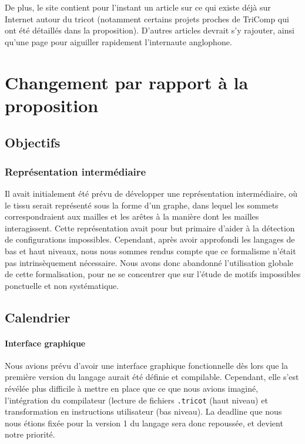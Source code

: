 \documentclass{article}
\begin{document}
De plus, le site contient pour l'instant un article sur ce qui existe déjà sur Internet autour du tricot (notamment certains projets
proches de TriComp qui ont été détaillés dans la proposition). D'autres articles devrait s'y rajouter, ainsi qu'une page pour aiguiller
rapidement l'internaute anglophone.

\section{Changement par rapport à la proposition}

\subsection{Objectifs}

\subsubsection{Représentation intermédiaire}

Il avait initialement été prévu de développer une représentation intermédiaire, où le tissu serait représenté sous la forme d'un graphe,
dans lequel les sommets correspondraient aux mailles et les arêtes à la manière dont les mailles interagissent. Cette représentation avait
pour but primaire d'aider à la détection de configurations impossibles. Cependant, après avoir approfondi les langages de bas et haut
niveaux, nous nous sommes rendus compte que ce formalisme n'était pas intrinsèquement nécessaire. %
Nous avons donc abandonné l'utilisation globale de cette formalisation, pour ne se concentrer que sur l'étude de motifs impossibles
ponctuelle et non systématique.

\subsection{Calendrier}

\paragraph{Interface graphique}

Nous avions prévu d'avoir une interface graphique fonctionnelle dès lors que la première version du langage aurait été définie et compilable.  
Cependant, elle s'est révélée plus difficile à mettre en place que ce que nous avions imaginé, l'intégration du compilateur (lecture de fichiers 
\texttt{.tricot} (haut niveau) et transformation en instructions utilisateur (bas niveau).
La deadline que nous nous étions fixée pour la version 1 du langage sera donc repoussée, et devient notre priorité.
\end{document}

